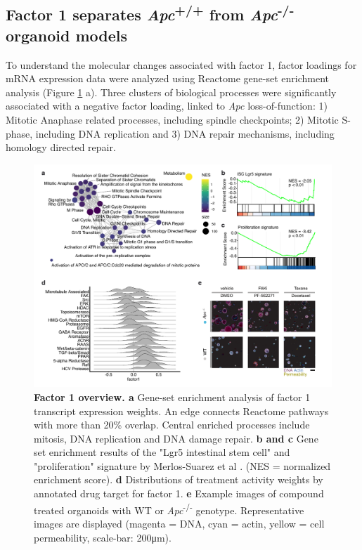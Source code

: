 \begin{flushleft}
\clearpage
\subsection{Factor 1 separates \textit{Apc}\textsuperscript{+/+} from \textit{Apc}\textsuperscript{-/-} organoid models}

To understand the molecular changes associated with factor 1, factor loadings for mRNA expression data were analyzed using Reactome gene-set enrichment analysis (Figure \ref{fig_190} a). Three clusters of biological processes were significantly associated with a negative factor loading, linked to \textit{Apc} loss-of-function: 1) Mitotic Anaphase related processes, including spindle checkpoints; 2) Mitotic S-phase, including DNA replication and 3) DNA repair mechanisms, including homology directed repair.

\begin{figure}[H]
\centering
\includegraphics[width=\textwidth,
                height=\textheight,
                keepaspectratio]{figures/adenomaprofiling/pdf/fig_2_1.pdf}
\caption[Factor 1 overview]{\textbf{Factor 1 overview. a} Gene-set enrichment analysis of factor 1 transcript expression weights. An edge connects Reactome pathways with more than 20\% overlap. Central enriched processes include mitosis, DNA replication and DNA damage repair. \textbf{b and c} Gene set enrichment results of the "Lgr5 intestinal stem cell" and "proliferation" signature by Merlos-Suarez et al \parencite{merlos-suarezIntestinalStemCell2011}. (NES = normalized enrichment score). \textbf{d} Distributions of treatment activity weights by annotated drug target for factor 1. \textbf{e} Example images of compound treated organoids with WT or \textit{Apc}\textsuperscript{-/-}  genotype. Representative images are displayed (magenta = DNA, cyan = actin, yellow = cell permeability, scale-bar: 200μm).}
\label{fig_190}
\end{figure}


\end{flushleft}
